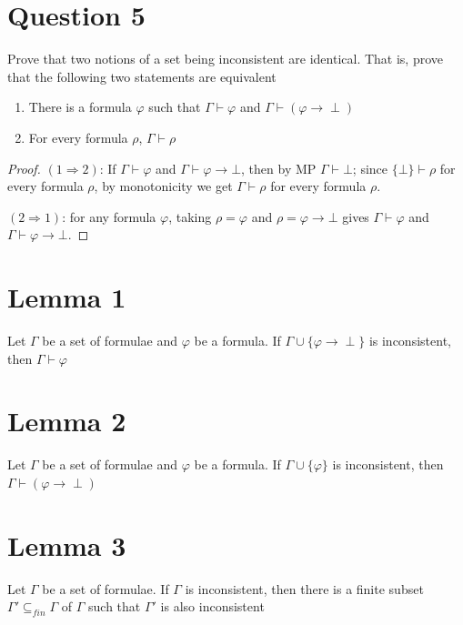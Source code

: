 \documentclass{article}
\begin{document}
\section*{Question 5}
Prove that two notions of a set being inconsistent are identical. That is, prove that the following two statements are equivalent
\begin{enumerate}
    \item There is a formula $\varphi$ such that $\Gamma \vdash \varphi$ and $\Gamma \vdash (\varphi \rightarrow \perp)$
    \item For every formula $\rho$, $\Gamma \vdash \rho$
\end{enumerate}
\begin{proof}
    $(1 \Rightarrow 2)$: If $\Gamma \vdash \varphi$ and $\Gamma \vdash \varphi \rightarrow \bot$, then by MP $\Gamma \vdash \bot$; since $\{\bot\} \vdash \rho$ for every formula $\rho$, by monotonicity we get $\Gamma \vdash \rho$ for every formula $\rho$.
    
    $(2 \Rightarrow 1)$: for any formula $\varphi$, taking $\rho=\varphi$ and $\rho=\varphi \rightarrow \bot$ gives $\Gamma \vdash \varphi$ and $\Gamma \vdash \varphi \rightarrow \bot$.
    \end{proof}
\section*{Lemma 1}
Let $\Gamma$ be a set of formulae and $\varphi$ be a formula. If $\Gamma \cup \{\varphi \rightarrow \perp\}$ is inconsistent, then $\Gamma \vdash \varphi$

\section*{Lemma 2}
Let $\Gamma$ be a set of formulae and $\varphi$ be a formula. If $\Gamma \cup \{\varphi\}$ is inconsistent, then $\Gamma \vdash (\varphi \rightarrow \perp)$

\section*{Lemma 3}
Let $\Gamma$ be a set of formulae. If $\Gamma$ is inconsistent, then there is a finite subset $\Gamma' \subseteq_{fin} \Gamma$ of $\Gamma$ such that $\Gamma'$ is also inconsistent
\end{document}
